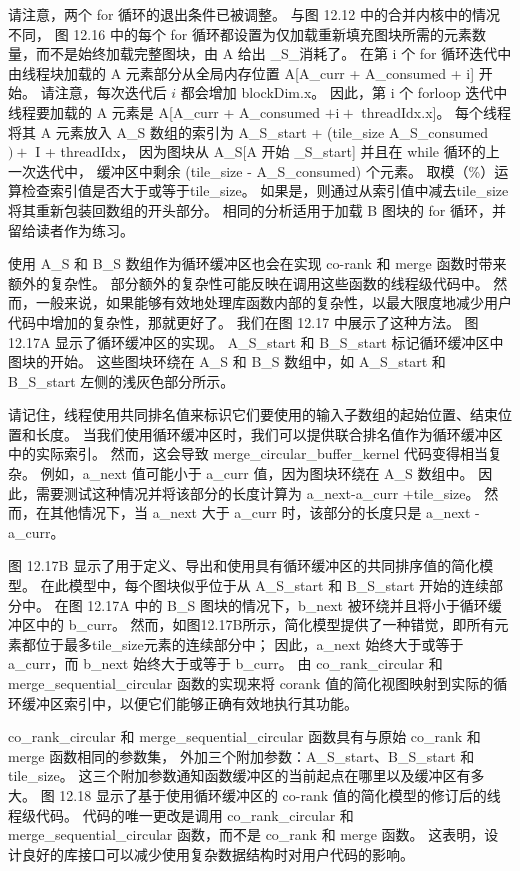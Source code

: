 请注意，两个 for 循环的退出条件已被调整。 与图 12.12 中的合并内核中的情况不同，
图 12.16 中的每个 for 循环都设置为仅加载重新填充图块所需的元素数量，而不是始终加载完整图块，由 A 给出 \_S\_消耗了。 
在第 i 个 for 循环迭代中由线程块加载的 A 元素部分从全局内存位置 A[A\_curr + A\_consumed + i] 开始。 
请注意，每次迭代后 $i$ 都会增加 blockDim.x。 
因此，第 i 个 forloop 迭代中线程要加载的 A 元素是 A[A\_curr + A\_consumed $+\mathrm{i}+$ threadIdx.x]。 
每个线程将其 A 元素放入 A\_S 数组的索引为 A\_S\_start + (tile\_size A\_S\_consumed $)+$ I + threadIdx，
因为图块从 A\_S[A 开始 \_S\_start] 并且在 while 循环的上一次迭代中，
缓冲区中剩余 (tile\_size - A\_S\_consumed) 个元素。 取模（\%）运算检查索引值是否大于或等于tile\_size。 
如果是，则通过从索引值中减去tile\_size 将其重新包装回数组的开头部分。 
相同的分析适用于加载 B 图块的 for 循环，并留给读者作为练习。

使用 A\_S 和 B\_S 数组作为循环缓冲区也会在实现 co-rank 和 merge 函数时带来额外的复杂性。 
部分额外的复杂性可能反映在调用这些函数的线程级代码中。 
然而，一般来说，如果能够有效地处理库函数内部的复杂性，以最大限度地减少用户代码中增加的复杂性，那就更好了。 
我们在图 12.17 中展示了这种方法。 图 12.17A 显示了循环缓冲区的实现。 
A\_S\_start 和 B\_S\_start 标记循环缓冲区中图块的开始。 
这些图块环绕在 A\_S 和 B\_S 数组中，如 A\_S\_start 和 B\_S\_start 左侧的浅灰色部分所示。

请记住，线程使用共同排名值来标识它们要使用的输入子数组的起始位置、结束位置和长度。 
当我们使用循环缓冲区时，我们可以提供联合排名值作为循环缓冲区中的实际索引。 
然而，这会导致 merge\_circular\_buffer\_kernel 代码变得相当复杂。 
例如，a\_next 值可能小于 a\_curr 值，因为图块环绕在 A\_S 数组中。 
因此，需要测试这种情况并将该部分的长度计算为 a\_next-a\_curr +tile\_size。 
然而，在其他情况下，当 a\_next 大于 a\_curr 时，该部分的长度只是 a\_next - a\_curr。

图 12.17B 显示了用于定义、导出和使用具有循环缓冲区的共同排序值的简化模型。 
在此模型中，每个图块似乎位于从 A\_S\_start 和 B\_S\_start 开始的连续部分中。 
在图 12.17A 中的 B\_S 图块的情况下，b\_next 被环绕并且将小于循环缓冲区中的 b\_curr。 
然而，如图12.17B所示，简化模型提供了一种错觉，即所有元素都位于最多tile\_size元素的连续部分中； 
因此，a\_next 始终大于或等于 a\_curr，而 b\_next 始终大于或等于 b\_curr。 
由 co\_rank\_circular 和 merge\_sequential\_circular 函数的实现来将 corank 值的简化视图映射到实际的循环缓冲区索引中，以便它们能够正确有效地执行其功能。

co\_rank\_circular 和 merge\_sequential\_circular 函数具有与原始 co\_rank 和 merge 函数相同的参数集，
外加三个附加参数：A\_S\_start、B\_S\_start 和tile\_size。 
这三个附加参数通知函数缓冲区的当前起点在哪里以及缓冲区有多大。 
图 12.18 显示了基于使用循环缓冲区的 co-rank 值的简化模型的修订后的线程级代码。 
代码的唯一更改是调用 co\_rank\_circular 和 merge\_sequential\_circular 函数，而不是 co\_rank 和 merge 函数。 
这表明，设计良好的库接口可以减少使用复杂数据结构时对用户代码的影响。

